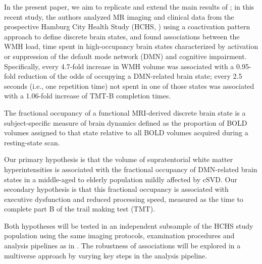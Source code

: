 In the present paper, we aim to replicate and extend the main results of \citep{Schlemm2022-he};
in this recent study, the authors analyzed MR imaging and clinical data from the prospective Hamburg City Health Study (HCHS, \citep{Jagodzinski2020-lx}) using a coactivation pattern approach to define discrete brain states, and found associations between the WMH load, time spent in high-occupancy brain states characterized by activation or suppression of the default mode network (DMN) and cognitive impairment. 
Specifically, every 4.7-fold increase in WMH volume was associated with a 0.95-fold reduction of the odds of occupying a DMN-related brain state; every 2.5 seconds (i.e., one repetition time) not spent in one of those states was associated with a 1.06-fold increase of TMT-B completion times.

The fractional occupancy of a functional MRI-derived discrete brain state is a subject-specific measure of brain dynamics defined as the proportion of BOLD volumes assigned to that state relative to all BOLD volumes acquired during a resting-state scan.

Our primary hypothesis is that the volume of supratentorial white matter hyperintensities is associated with the fractional occupancy of DMN-related brain states in a middle-aged to elderly population mildly affected by cSVD.
Our secondary hypothesis is that this fractional occupancy is associated with executive dysfunction and reduced processing speed, measured as the time to complete part B of the trail making test (TMT).

Both hypotheses will be tested in an independent subsample of the HCHS study population using the same imaging protocols, examination procedures and analysis pipelines as in \citep{Schlemm2022-he}.
The robustness of associations will be explored in a multiverse approach by varying key steps in the analysis pipeline.

